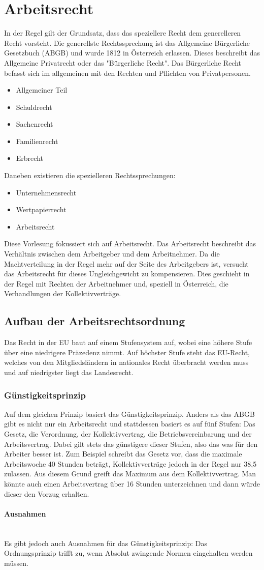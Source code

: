 \documentclass{article}
\newcommand{\paragraphlb}[1]{\paragraph{#1}\mbox{}\\}
\begin{document}
	\section{Arbeitsrecht}
	In der Regel gilt der Grundsatz, dass das speziellere Recht dem generelleren Recht vorsteht. Die generellste Rechtssprechung ist das Allgemeine Bürgerliche Gesetzbuch (ABGB) und wurde 1812 in Österreich erlassen. Dieses beschreibt das Allgemeine Privatrecht oder das "Bürgerliche Recht".
	Das Bürgerliche Recht befasst sich im allgemeinen mit den Rechten und Pflichten von Privatpersonen.
	\begin{itemize}
		\item{Allgemeiner Teil}
		\item{Schuldrecht}
		\item{Sachenrecht}
		\item{Familienrecht}
		\item{Erbrecht}
	\end{itemize}
	Daneben existieren die spezielleren Rechtssprechungen:
	\begin{itemize}
		\item{Unternehmensrecht}
		\item{Wertpapierrecht}
		\item{Arbeitsrecht}
	\end{itemize}
	Diese Vorlesung fokussiert sich auf Arbeitsrecht. Das Arbeitsrecht beschreibt das Verhältnis zwischen dem Arbeitgeber und dem Arbeitnehmer. Da die Machtverteilung in der Regel mehr auf der Seite des Arbeitgebers ist, versucht das Arbeitsrecht für dieses Ungleichgewicht zu kompensieren. Dies geschieht in der Regel mit Rechten der Arbeitnehmer und, speziell in Österreich, die Verhandlungen der Kollektivverträge. \\
	\subsection{Aufbau der Arbeitsrechtsordnung}
	Das Recht in der EU baut auf einem Stufensystem auf, wobei eine höhere Stufe über eine niedrigere Präzedenz nimmt. Auf höchster Stufe steht das EU-Recht, welches von den Mitgliedsländern in nationales Recht überbracht werden muss und auf niedrigster liegt das Landesrecht. \\
	\subsubsection{Günstigkeitsprinzip}
	Auf dem gleichen Prinzip basiert das Günstigkeitsprinzip. Anders als das ABGB gibt es nicht nur ein Arbeitsrecht und stattdessen basiert es auf fünf Stufen: Das Gesetz, die Verordnung, der Kollektivvertrag, die Betriebsvereinbarung und der Arbeitsvertrag. Dabei gilt stets das günstigere dieser Stufen, also das was für den Arbeiter besser ist. Zum Beispiel schreibt das Gesetz vor, dass die maximale Arbeitswoche 40 Stunden beträgt, Kollektivverträge jedoch in der Regel nur 38,5 zulassen. Aus diesem Grund greift das Maximum aus dem Kollektivvertrag. Man könnte auch einen Arbeitsvertrag über 16 Stunden unterzeichnen und dann würde dieser den Vorzug erhalten.
	\paragraphlb{Ausnahmen}
	Es gibt jedoch auch Ausnahmen für das Günstigkeitsprinzip: Das Ordnungsprinzip trifft zu, wenn Absolut zwingende Normen eingehalten werden müssen. 
\end{document}
